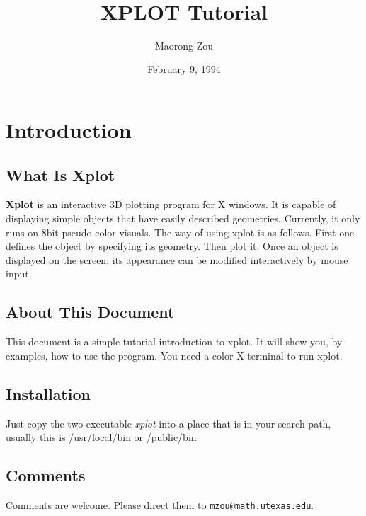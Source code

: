 %
%


\title{\makebox[1.5in][r]{ }\\
\makebox[1.5in][r]{ } \\
\makebox[1.5in][r]{ } \\
\makebox[1.5in][r]{ } \\XPLOT Tutorial }
\author{Maorong Zou}
\date{February 9, 1994}


\maketitle
\newpage

\tableofcontents
\newpage
\section{ Introduction }

\subsection{What Is Xplot}
{\bf Xplot} is an interactive 3D plotting program 
for X windows. It is capable of displaying simple objects
that have easily described geometries. Currently, it only 
runs on 8bit pseudo color visuals. 
The way of using  xplot 
is as follows. First one defines the object 
by specifying its geometry. Then 
plot it. Once an object is displayed on the 
screen, its appearance can be modified interactively 
by mouse input.


\subsection{About This Document}
This document is a simple tutorial introduction
to  xplot. It will show you, by examples, how
to use the program. You need a color X terminal to
run xplot.

\subsection{Installation}
Just copy the two executable {\it xplot} 
into a place that is in your search path, usually this is
/usr/local/bin or /public/bin.  

\subsection{Comments}
Comments are welcome. Please direct them to 
\verb+mzou@math.utexas.edu+.


